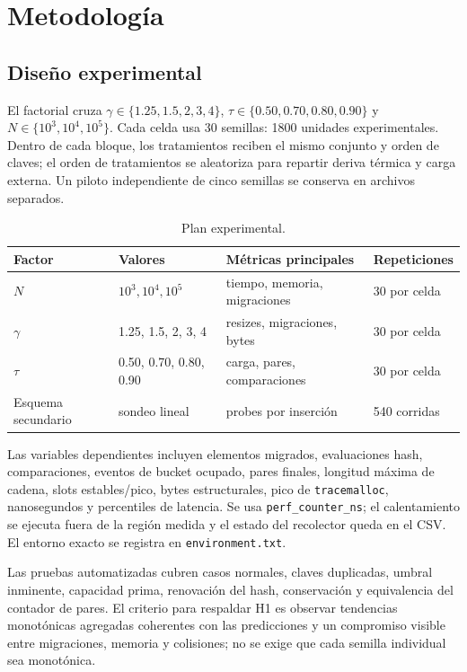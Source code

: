 \documentclass[11pt]{article}
\begin{document}
\section{Metodología}
\subsection{Diseño experimental}
El factorial cruza $\gamma\in\{1.25,1.5,2,3,4\}$, $\tau\in\{0.50,0.70,0.80,0.90\}$ y $N\in\{10^3,10^4,10^5\}$. Cada celda usa 30 semillas: 1800 unidades experimentales. Dentro de cada bloque, los tratamientos reciben el mismo conjunto y orden de claves; el orden de tratamientos se aleatoriza para repartir deriva térmica y carga externa. Un piloto independiente de cinco semillas se conserva en archivos separados.

\begin{table}[H]
\centering\small
\caption{Plan experimental.}
\begin{tabularx}{\linewidth}{p{2.7cm}X X p{2.2cm}}
\toprule Factor & Valores & Métricas principales & Repeticiones \\
\midrule
$N$ & $10^3,10^4,10^5$ & tiempo, memoria, migraciones & 30 por celda\\
$\gamma$ & 1.25, 1.5, 2, 3, 4 & resizes, migraciones, bytes & 30 por celda\\
$\tau$ & 0.50, 0.70, 0.80, 0.90 & carga, pares, comparaciones & 30 por celda\\
Esquema secundario & sondeo lineal & probes por inserción & 540 corridas\\
\bottomrule
\end{tabularx}
\end{table}

Las variables dependientes incluyen elementos migrados, evaluaciones hash, comparaciones, eventos de bucket ocupado, pares finales, longitud máxima de cadena, slots estables/pico, bytes estructurales, pico de \texttt{tracemalloc}, nanosegundos y percentiles de latencia. Se usa \texttt{perf\_counter\_ns}; el calentamiento se ejecuta fuera de la región medida y el estado del recolector queda en el CSV. El entorno exacto se registra en \texttt{environment.txt}.

Las pruebas automatizadas cubren casos normales, claves duplicadas, umbral inminente, capacidad prima, renovación del hash, conservación y equivalencia del contador de pares. El criterio para respaldar H1 es observar tendencias monotónicas agregadas coherentes con las predicciones y un compromiso visible entre migraciones, memoria y colisiones; no se exige que cada semilla individual sea monotónica.
\end{document}
